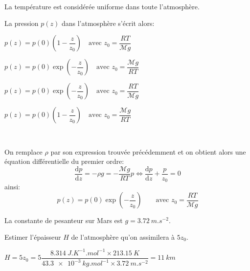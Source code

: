 La température est considérée uniforme dans toute l'atmosphère.


\begin{enonce}
La pression $p(z)$ dans l'atmosphère s'écrit alors:
\begin{listeQCM2Colonnes}
	\item $p(z) =p(0)\left(1-\dfrac{z}{z_{0}}\right)\ensuremath{\quad}\text{avec }z_{0}=\dfrac{RT}{\mathcal{M}g}$
	\item $p(z)=p(0)\exp\left(-\dfrac{z}{z_{0}}\right)\ensuremath{\quad}\text{avec }z_{0}=\dfrac{\mathcal{M}g}{RT}$
	\item $p(z)=p(0)\exp\left(-\dfrac{z}{z_{0}}\right)\ensuremath{\quad}\text{avec }z_{0}=\dfrac{RT}{\mathcal{M}g}$
	\item $p(z)=p(0)\left(1-\dfrac{z}{z_{0}}\right)\ensuremath{\quad}\text{avec }z_{0}=\dfrac{\mathcal{M}g}{RT}$

\end{listeQCM2Colonnes}
$\,$ \\ 

\end{enonce}
\reponse{\reponseC{}}
\begin{corrige}
On remplace $\rho$ par son expression trouvée précédemment et on obtient alors une équation différentielle du premier ordre:
\[
\dfrac{\mathrm{d}p}{\mathrm{d}z}=-\rho g=-\dfrac{\mathcal{M}g}{RT}p\Leftrightarrow\dfrac{\mathrm{d}p}{\mathrm{d}z}+\dfrac{p}{z_{0}}=0
\]
ainsi:
\[
p(z)=p(0)\exp\left(-\dfrac{z}{z_{0}}\right)\ensuremath{\qquad}\text{avec }z_{0}=\dfrac{RT}{\mathcal{M}g}
\]
\end{corrige}


La constante de pesanteur sur Mars est $g=\SI{3.72}{m.s^{-2}}$. 

\begin{enonce}
Estimer
l'épaisseur $H$ de l'atmosphère qu'on assimilera à $5z_{0}$.
\end{enonce}
\begin{corrige}
$H=5z_{0}=5\dfrac{\SI{8.314}{J.K^{-1}.mol^{-1}}\times\SI{213.15}{K}}{\SI{43.3e-3}{kg.mol^{-1}}\times\SI{3.72}{m.s^{-2}}}=\SI{11}{km}$
\end{corrige}
\finEntrainement







